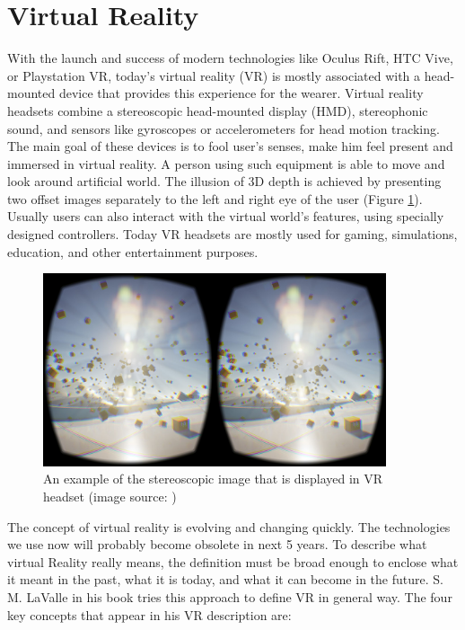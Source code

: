 \section{Virtual Reality}

With the launch and success of modern technologies like Oculus Rift, HTC Vive, or Playstation VR, today’s virtual reality (VR) is mostly associated with a head-mounted device that provides this experience for the wearer. Virtual reality headsets combine a stereoscopic head-mounted display (HMD), stereophonic sound, and sensors like gyroscopes or accelerometers for head motion tracking. The main goal of these devices is to fool user’s senses, make him feel present and immersed in virtual reality. A person using such equipment is able to move and look around artificial world. The illusion of 3D depth is achieved by presenting two offset images separately to the left and right eye of the user (Figure \ref{fig:STEREOSCOPIC}). Usually users can also interact with the virtual world's features, using specially designed controllers. Today VR headsets are mostly used for gaming, simulations, education, and other entertainment purposes.

\begin{figure}[th]
\centering
\includegraphics[width=0.9\textwidth]{img/stereoscopic.jpg}
\caption{An example of the stereoscopic image that is displayed in VR headset (image source: \cite{STEREOSCOPIC_IMAGE})}
\label{fig:STEREOSCOPIC}
\end{figure}

The concept of virtual reality is evolving and changing quickly. The technologies we use now will probably become obsolete in next 5 years. To describe what virtual Reality really means, the definition must be broad enough to enclose what it meant in the past, what it is today, and what it can become in the future. S. M. LaValle in his book \cite{VR_BOOK} tries this approach to define VR in general way. The four key concepts that appear in his VR description are:

